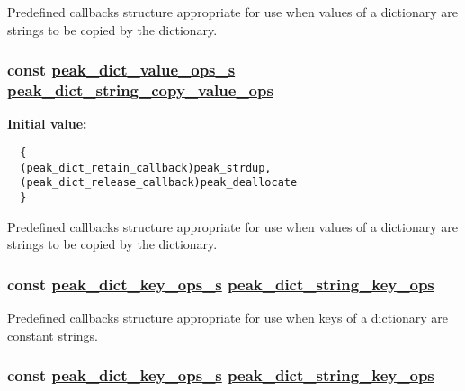 Predefined callbacks structure appropriate for use when values of a dictionary are strings to be copied by the dictionary. \hypertarget{group__dict_ga19}{
\subsubsection[peak\_\-dict\_\-string\_\-copy\_\-value\_\-ops]{\setlength{\rightskip}{0pt plus 5cm}const \hyperlink{structpeak__dict__value__ops__s}{peak\_\-dict\_\-value\_\-ops\_\-s} \hyperlink{group__dict_ga20}{peak\_\-dict\_\-string\_\-copy\_\-value\_\-ops}}}
\label{group__dict_ga19}


{\bf Initial value:}

\footnotesize\begin{verbatim}
  {
  (peak_dict_retain_callback)peak_strdup,
  (peak_dict_release_callback)peak_deallocate
  }
\end{verbatim}\normalsize 
Predefined callbacks structure appropriate for use when values of a dictionary are strings to be copied by the dictionary. \hypertarget{group__dict_ga8}{
\subsubsection[peak\_\-dict\_\-string\_\-key\_\-ops]{\setlength{\rightskip}{0pt plus 5cm}const \hyperlink{structpeak__dict__key__ops__s}{peak\_\-dict\_\-key\_\-ops\_\-s} \hyperlink{group__dict_ga8}{peak\_\-dict\_\-string\_\-key\_\-ops}}}
\label{group__dict_ga8}


Predefined callbacks structure appropriate for use when keys of a dictionary are constant strings. \hypertarget{group__dict_ga7}{
\subsubsection[peak\_\-dict\_\-string\_\-key\_\-ops]{\setlength{\rightskip}{0pt plus 5cm}const \hyperlink{structpeak__dict__key__ops__s}{peak\_\-dict\_\-key\_\-ops\_\-s} \hyperlink{group__dict_ga8}{peak\_\-dict\_\-string\_\-key\_\-ops}}}
\label{group__dict_ga7}


